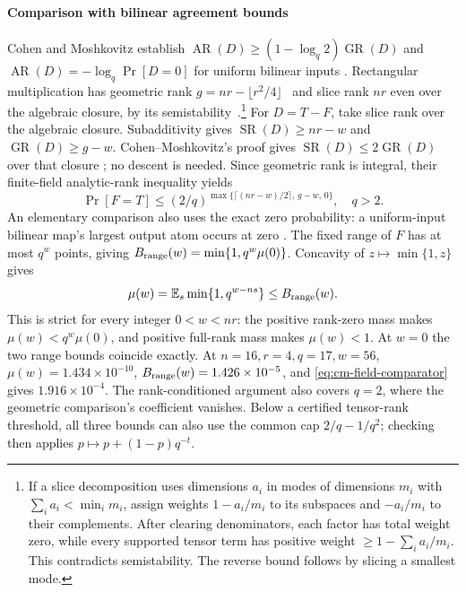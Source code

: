 \paragraph{Comparison with bilinear agreement bounds}
\label{sec:profile-comparison}
Cohen and Moshkovitz establish
$\operatorname{AR}(D)\ge(1-\log_q2)\operatorname{GR}(D)$ and
$\operatorname{AR}(D)=-\log_q\Pr[D=0]$ for uniform bilinear inputs
\cite[Proposition~4.1 and Fact~4.5]{cohen2022structure}. Rectangular multiplication has geometric
rank $g=nr-\lfloor r^2/4\rfloor$~\cite{kopparty2023geometric}
and slice rank $nr$ even over the algebraic closure, by its
semistability~\cite[Example~24 and Lemma~23]{christandl2023weighted}.\footnote{If a slice decomposition uses dimensions $a_i$ in modes of
dimensions $m_i$ with $\sum_i a_i<\min_i m_i$, assign weights
$1-a_i/m_i$ to its subspaces and $-a_i/m_i$ to their complements.
After clearing denominators, each factor has total weight zero, while
every supported tensor term has positive weight
$\ge1-\sum_i a_i/m_i$. This contradicts semistability. The reverse
bound follows by slicing a smallest mode.}
For $D=T-F$, take slice rank over the algebraic closure.
Subadditivity gives $\operatorname{SR}(D)\ge nr-w$ and
$\operatorname{GR}(D)\ge g-w$. Cohen--Moshkovitz's proof gives
$\operatorname{SR}(D)\le2\operatorname{GR}(D)$ over that closure
\cite[proof of Theorem~3.1]{cohen2022structure}; no descent is needed.
Since geometric rank is integral, their finite-field analytic-rank
inequality yields
\begin{equation}\label{eq:cm-field-comparator}
 \Pr[F=T]\le (2/q)^{\max\{\lceil(nr-w)/2\rceil,\,g-w,\,0\}},\quad q>2.
\end{equation}
An elementary comparison also uses the exact zero probability:
a uniform-input bilinear map's largest output atom occurs at zero
\cite[proof of Proposition~5.1]{cohen2022structure}. The fixed range of
$F$ has at most $q^w$ points, giving
$B_{\rm range}(w)=\min\{1,q^w\mu(0)\}$. Concavity of $z\mapsto\min\{1,z\}$ gives
\begin{equation}\label{eq:profile-vs-range}
 \mu(w)=\mathbb E_s\min\{1,q^{w-ns}\}\le B_{\rm range}(w).
\end{equation}
This is strict for every integer $0<w<nr$: the positive rank-zero
mass makes $\mu(w)<q^w\mu(0)$, and positive full-rank mass makes
$\mu(w)<1$. At $w=0$ the two range bounds coincide exactly.
At $n=16,r=4,q=17,w=56$, $\mu(w)=1.434\times10^{-10}$,
$B_{\rm range}(w)=1.426\times10^{-5}$, and
\eqref{eq:cm-field-comparator} gives $1.916\times10^{-4}$.
The rank-conditioned argument also covers $q=2$, where the geometric
comparison's coefficient vanishes. Below a certified tensor-rank
threshold, all three bounds can also use the common cap $2/q-1/q^2$;
checking then applies $p\mapsto p+(1-p)q^{-t}$.
